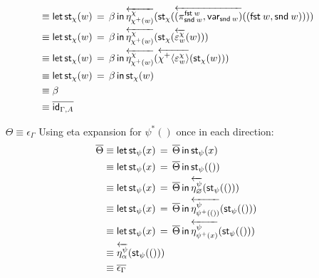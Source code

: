 \documentclass[10pt]{article}
\theoremstyle{definition}
\let\emptyset\varnothing
\newcommand\dsd[1]{\ensuremath{\mathsf{#1}}}
\newcommand{\app}[2]{\ensuremath{#1 \: #2}}
\newcommand{\fst}[1]{\app{\dsd{fst}}{#1}}
\newcommand{\snd}[1]{\app{\dsd{snd}}{#1}}
\newcommand{\id}{\mathsf{id}}
\newcommand{\rewrite}[2]{\overleftarrow{#1}(#2)}
\newcommand\St[2]{\ensuremath{{#1}^*(#2)}}
\newcommand\StI[2]{\ensuremath{\mathsf{st}_{#1}(#2)}}
\newcommand\StE[4]{\ensuremath{\mathsf{let} \, \StI{#1}{#3} \, = \, {#2} \, \mathsf{in} \, #4}}
\newcommand\TrPlus[2]{\ensuremath{{#1}^+(#2)}}
\newcommand\ApPlus[2]{\ensuremath{{#1}^+ \langle #2 \rangle }}
\begin{document}
\begin{enumerate}[style = multiline, labelwidth = 80pt]
\begin{align*}
&\equiv \StE{\chi}{\beta}{w}{\rewrite{\eta^\chi_{\TrPlus{\chi}{w}}}{\StI{\chi}{\rewrite{(\pi^{\fst w}_{\snd w},\qvar{\snd w})}{(\fst w, \snd w)}}}} \\
&\equiv \StE{\chi}{\beta}{w}{\rewrite{\eta^\chi_{\TrPlus{\chi}{w}}}{\StI{\chi}{\rewrite{\varepsilon^\chi_w}{w}}}} \\
&\equiv \StE{\chi}{\beta}{w}{\rewrite{\eta^\chi_{\TrPlus{\chi}{w}}}{\rewrite{\ApPlus{\chi}{\varepsilon^\chi_w}}{\StI{\chi}{w}}}} \\
&\equiv \StE{\chi}{\beta}{w}{\StI{\chi}{w}} \\
&\equiv \beta \\
&\equiv \upstairs{\id_{\Gamma, A}}
\end{align*}

\item[$\Theta \equiv \epsilon_\Gamma$] Using eta expansion for $\St{\psi}{}$ once in each direction:
\begin{align*}
\upstairs{\Theta} 
&\equiv \StE{\psi}{\upstairs{\Theta}}{x}{\StI{\psi}{x}} \\
&\equiv \StE{\psi}{\upstairs{\Theta}}{x}{\StI{\psi}{()}} \\
&\equiv \StE{\psi}{\upstairs{\Theta}}{x}{\rewrite{\eta^\psi_{\emptyset}}{\StI{\psi}{()}}} \\
&\equiv \StE{\psi}{\upstairs{\Theta}}{x}{\rewrite{\eta^\psi_{\TrPlus{\psi}{()}}}{\StI{\psi}{()}}} \\
&\equiv \StE{\psi}{\upstairs{\Theta}}{x}{\rewrite{\eta^\psi_{\TrPlus{\psi}{x}}}{\StI{\psi}{()}}} \\
&\equiv \rewrite{\eta^\psi_{\alpha}}{\StI{\psi}{()}} \\
&\equiv \upstairs{\epsilon_\Gamma}
\end{align*}
\end{enumerate}
\end{document}
